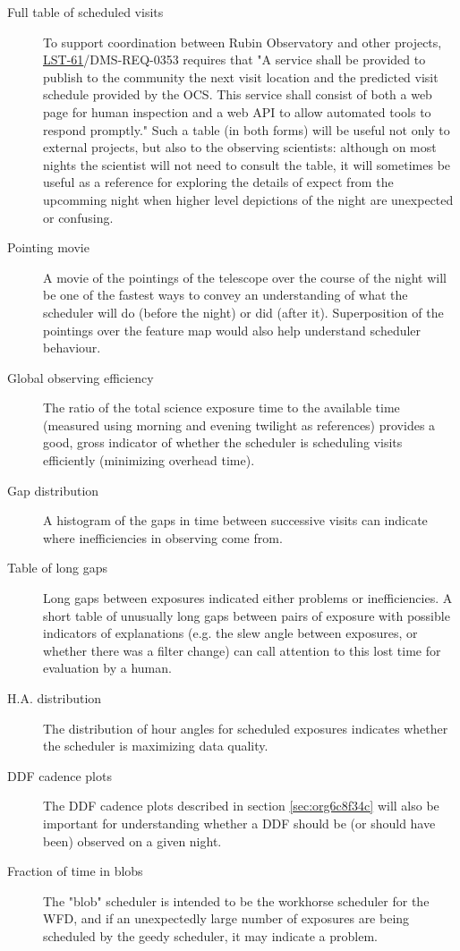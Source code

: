 \begin{description}
\item[{Full table of scheduled visits}] To support coordination between Rubin Observatory and other projects, \href{https://ls.st/lse-61}{LST-61}/DMS-REQ-0353 requires that "A service shall be provided to publish to the community the next visit location and the predicted visit schedule provided by the OCS. This service shall consist of both a web page for human inspection and a web API to allow automated tools to respond promptly." Such a table (in both forms) will be useful not only to external projects, but also to the observing scientists: although on most nights the scientist will not need to consult the table, it will sometimes be useful as a reference for exploring the details of expect from the upcomming night when higher level depictions of the night are unexpected or confusing.
\item[{Pointing movie}] A movie of the pointings of the telescope over the course of the night will be one of the fastest ways to convey an understanding of what the scheduler will do (before the night) or did (after it). Superposition of the pointings over the feature map would also help understand scheduler behaviour.
\item[{Global observing efficiency}] The ratio of the total science exposure time to the available time (measured using morning and evening twilight as references) provides a good, gross indicator of whether the scheduler is scheduling visits efficiently (minimizing overhead time).
\item[{Gap distribution}] A histogram of the gaps in time between successive visits can indicate where inefficiencies in observing come from.
\item[{Table of long gaps}] Long gaps between exposures indicated either problems or inefficiencies. A short table of unusually long gaps between pairs of exposure with possible indicators of explanations (e.g. the slew angle between exposures, or whether there was a filter change) can call attention to this lost time for evaluation by a human.
\item[{H.A. distribution}] The distribution of hour angles for scheduled exposures indicates whether the scheduler is maximizing data quality.
\item[{DDF cadence plots}] The DDF cadence plots described in section \ref{sec:org6c8f34c} will also be important for understanding whether a DDF should be (or should have been) observed on a given night.
\item[{Fraction of time in blobs}] The "blob" scheduler is intended to be the workhorse scheduler for the WFD, and if an unexpectedly large number of exposures are being scheduled by the geedy scheduler, it may indicate a problem.
\end{description}

